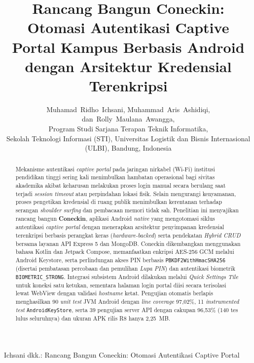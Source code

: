 \documentclass[10pt,journal,compsoc]{IEEEtran}
\begin{document}
\title{Rancang Bangun Coneckin: Otomasi Autentikasi Captive Portal Kampus Berbasis Android dengan Arsitektur Kredensial Terenkripsi}

\author{
    Muhamad~Ridho~Ichsani,
    Muhammad~Aris~Ashidiqi,
    dan~Rolly~Maulana~Awangga,\\
    Program Studi Sarjana Terapan Teknik Informatika,\\
    Sekolah Teknologi Informasi (STI), Universitas Logistik dan Bisnis Internasional (ULBI), Bandung, Indonesia
}

%
{Ichsani dkk.: Rancang Bangun Coneckin: Otomasi Autentikasi Captive Portal}

\maketitle

\begin{abstract}
Mekanisme autentikasi \textit{captive portal} pada jaringan nirkabel (Wi-Fi) institusi pendidikan tinggi sering kali menimbulkan hambatan operasional bagi sivitas akademika akibat keharusan melakukan proses login manual secara berulang saat terjadi \textit{session timeout} atau perpindahan lokasi fisik. Selain mengurangi kenyamanan, proses pengetikan kredensial di ruang publik menimbulkan kerentanan terhadap serangan \textit{shoulder surfing} dan pembacaan memori tidak sah. Penelitian ini menyajikan rancang bangun \textbf{Coneckin}, aplikasi Android \textit{native} yang mengotomasi siklus autentikasi \textit{captive portal} dengan menerapkan arsitektur penyimpanan kredensial terenkripsi berbasis perangkat keras (\textit{hardware-backed}) serta pendekatan \textit{Hybrid CRUD} bersama layanan API Express 5 dan MongoDB. Coneckin dikembangkan menggunakan bahasa Kotlin dan Jetpack Compose, memanfaatkan enkripsi AES-256 GCM melalui Android Keystore, serta perlindungan akses PIN berbasis \texttt{PBKDF2WithHmacSHA256} (disertai pembatasan percobaan dan pemulihan \textit{Lupa PIN}) dan autentikasi biometrik \texttt{BIOMETRIC\_STRONG}. Integrasi subsistem Android dilakukan melalui \textit{Quick Settings Tile} untuk koneksi satu ketukan, sementara halaman login portal diisi secara terisolasi lewat WebView dengan validasi \textit{hostname} ketat. Pengujian otomatis berlapis menghasilkan 90 \textit{unit test} JVM Android dengan \textit{line coverage} 97,02\%, 11 \textit{instrumented test} \texttt{AndroidKeyStore}, serta 39 pengujian server API dengan cakupan 96,53\% (140 tes lulus seluruhnya) dan ukuran APK rilis R8 hanya 2,25~MB.
\end{abstract}
\end{document}
